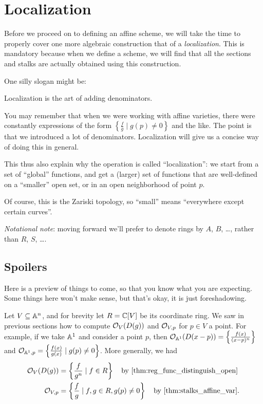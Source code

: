 \chapter{Localization}
Before we proceed on to defining an affine scheme,
we will take the time to properly cover one more algebraic construction
that of a \emph{localization}.
This is mandatory because when we define a scheme,
we will find that all the sections and stalks
are actually obtained using this construction.

One silly slogan might be:
\begin{moral}
	Localization is the art of adding denominators.
\end{moral}
You may remember that when we were working with affine varieties,
there were constantly expressions of the form
$\left\{ \frac{f}{g} \mid g(p) \neq 0 \right\}$
and the like.
The point is that we introduced a lot of denominators.
Localization will give us a concise way of doing this in general.

This thus also explain why the operation is called ``localization'':
we start from a set of ``global'' functions, and get a (larger) set of functions
that are well-defined on a ``smaller'' open set, or in an open neighborhood
of point $p$.

Of course, this is the Zariski topology, so ``small'' means ``everywhere except certain curves''.

\emph{Notational note}:
moving forward we'll prefer to denote rings by $A$, $B$, \dots,
rather than $R$, $S$, \dots.

\section{Spoilers}
Here is a preview of things to come,
so that you know what you are expecting.
Some things here won't make sense,
but that's okay, it is just foreshadowing.

Let $V \subseteq \mathbb A^n$, and for brevity let $R = \mathbb C[V]$ be its coordinate ring.
We saw in previous sections how to compute $\mathcal O_V(D(g))$
and $\mathcal O_{V, p}$ for $p \in V$ a point.
For example, if we take $\mathbb A^1$ and consider a point $p$, then
$\mathcal O_{\mathbb A^1}(D(x-p)) = \left\{ \frac{f(x)}{(x-p)^n} \right\}$
and $\mathcal O_{\mathbb A^1, p} = \left\{ \frac{f(x)}{g(x)} \mid g(p) \neq 0 \right\}$.
More generally, we had
\begin{align*}
	\OO_{V}(D(g)) &= \left\{ \frac{f}{g^n} \mid f \in R \right\}
		\quad\text{by \Cref{thm:reg_func_distinguish_open}} \\
	\OO_{V,p} &= \left\{ \frac{f}{g} \mid f,g \in R, g(p) \neq 0 \right\}
		\quad\text{by \Cref{thm:stalks_affine_var}}.
\end{align*}

